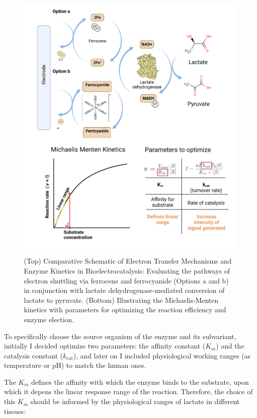 \documentclass[conference]{IEEEtran}
\begin{document}
\begin{figure}[t]
   \centering
   \includegraphics[width=0.9\columnwidth]{images/reaction.png}
   \caption{(Top) Comparative Schematic of Electron Transfer Mechanisms and Enzyme Kinetics in Bioelectrocatalysis:
   Evaluating the pathways of electron shuttling via ferrocene and ferrocyanide (Options a and b) in conjunction 
   with lactate dehydrogenase-mediated conversion of lactate to pyruvate. (Bottom) Illustrating the Michaelis-Menten 
   kinetics with parameters for optimizing the reaction efficiency and enzyme election.}
   \label{fig:reaction}
\end{figure}

To specifically choose the source organism of the enzyme and its subvariant, initially I decided optimize two parameters: the affinity constant (\(K_m\))
 and the catalysis constant (\(k_{\text{cat}}\)), and later on I included physiological working ranges (as temperature or pH) to match the human ones.

The \(K_m\) defines the affinity with which the enzyme binds to the substrate, upon which it depens the linear response range of the reaction. 
Therefore, the choice of this \(K_m\) should be informed by the physiological ranges of lactate in different tissues:
\end{document}
